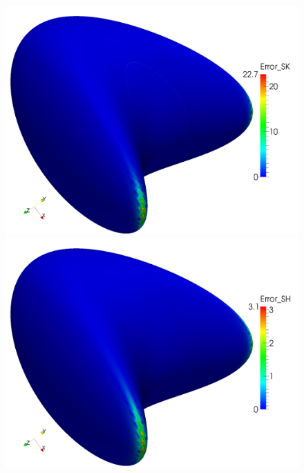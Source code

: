 \begin{figure}
\begin{minipage}[t]{0.49\textwidth}
       \centering\includegraphics[width=\textwidth]{bilder/Curvature/heineB/SK250k.png}
    \end{minipage}\hfill
    \begin{minipage}[t]{0.49\textwidth}
       \centering\includegraphics[width=\textwidth]{bilder/Curvature/heineB/SH250k.png}
    \end{minipage}\\
    \begin{minipage}[t]{0.49\textwidth}

\end{minipage}
\end{figure}
